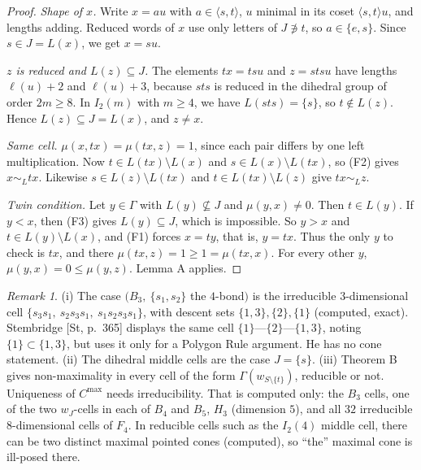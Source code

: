\documentclass[11pt]{amsart}
\newcommand{\gr}[1]{\textsf{#1}}
\theoremstyle{definition}
\theoremstyle{remark}
\newtheorem{remark}[theorem]{Remark}
\begin{document}
\begin{proof}
\emph{Shape of $x$.} Write $x=a u$ with $a\in\langle s,t\rangle$, $u$ minimal in its coset $\langle s,t\rangle u$, and lengths adding. Reduced words of $x$ use only letters of $J\not\ni t$, so $a\in\{e,s\}$. Since $s\in J=L(x)$, we get $x=su$.

\emph{$z$ is reduced and $L(z)\subseteq J$.} The elements $tx=tsu$ and $z=stsu$ have lengths $\ell(u)+2$ and $\ell(u)+3$, because $sts$ is reduced in the dihedral group of order $2m\ge8$. In $I_2(m)$ with $m\ge4$, we have $L(sts)=\{s\}$, so $t\notin L(z)$. Hence $L(z)\subseteq J=L(x)$, and $z\ne x$.

\emph{Same cell.} $\mu(x,tx)=\mu(tx,z)=1$, since each pair differs by one left multiplication. Now $t\in L(tx)\setminus L(x)$ and $s\in L(x)\setminus L(tx)$, so (F2) gives $x\sim_L tx$. Likewise $s\in L(z)\setminus L(tx)$ and $t\in L(tx)\setminus L(z)$ give $tx\sim_L z$.

\emph{Twin condition.} Let $y\in\Gamma$ with $L(y)\not\subseteq J$ and $\mu(y,x)\ne0$. Then $t\in L(y)$. If $y<x$, then (F3) gives $L(y)\subseteq J$, which is impossible. So $y>x$ and $t\in L(y)\setminus L(x)$, and (F1) forces $x=ty$, that is, $y=tx$. Thus the only $y$ to check is $tx$, and there $\mu(tx,z)=1\ge1=\mu(tx,x)$. For every other $y$, $\mu(y,x)=0\le\mu(y,z)$. Lemma A applies.
\end{proof}

\begin{remark}
(i) The case $(B_3,\ \{s_1,s_2\}$ the $4$-bond$)$ is the irreducible $3$-dimensional cell $\{s_3s_1,\ s_2s_3s_1,\ s_1s_2s_3s_1\}$, with descent sets $\{1,3\},\{2\},\{1\}$ (\gr{computed}, exact). Stembridge [St, p.~365] displays the same cell $\{1\}$---$\{2\}$---$\{1,3\}$, noting $\{1\}\subset\{1,3\}$, but uses it only for a Polygon Rule argument. He has no cone statement. (ii) The dihedral middle cells are the case $J=\{s\}$. (iii) Theorem B gives non-maximality in every cell of the form $\Gamma(w_{S\setminus\{t\}})$, reducible or not. Uniqueness of $C^{\max}$ needs irreducibility. That is \gr{computed} only: the $B_3$ cells, one of the two $w_J$-cells in each of $B_4$ and $B_5$, $H_3$ (dimension $5$), and all $32$ irreducible $8$-dimensional cells of $F_4$. In reducible cells such as the $I_2(4)$ middle cell, there can be two distinct maximal pointed cones (\gr{computed}), so ``the'' maximal cone is ill-posed there.
\end{remark}

\end{document}

